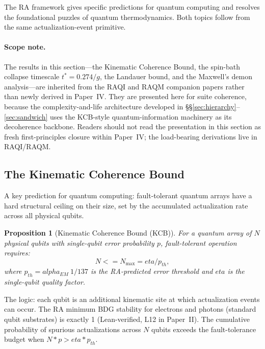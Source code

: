 \documentclass[11pt]{article}
\def\alpha{alpha}%
\def\eta{eta}%
\def\mathrm#1{#1}%
\def\frac#1#2{#1/#2}%
\def\cdot{*}%
\def\leq{<=}%
\def\approx{~}%
\newtheorem{proposition}{Proposition}
\begin{document}
The RA framework gives specific predictions for quantum computing and resolves the foundational puzzles of quantum thermodynamics. Both topics follow from the same actualization-event primitive.

\paragraph{Scope note.} The results in this section---the Kinematic Coherence Bound, the spin-bath collapse timescale $t^*=0.274/g$, the Landauer bound, and the Maxwell's demon analysis---are inherited from the RAQI and RAQM companion papers rather than newly derived in Paper~IV. They are presented here for suite coherence, because the complexity-and-life architecture developed in \S\S\ref{sec:hierarchy}--\ref{sec:sandwich} uses the KCB-style quantum-information machinery as its decoherence backbone. Readers should not read the presentation in this section as fresh first-principles closure within Paper~IV; the load-bearing derivations live in RAQI/RAQM.

\subsection{The Kinematic Coherence Bound}
\label{sec:kcb}

A key prediction for quantum computing: fault-tolerant quantum arrays have a hard structural ceiling on their size, set by the accumulated actualization rate across all physical qubits.

\begin{proposition}[Kinematic Coherence Bound (KCB)]
\label{prop:kcb}
For a quantum array of $N$ physical qubits with single-qubit error probability $p$, fault-tolerant operation requires:
\begin{equation}
N \leq N_{\max} = \frac{\eta}{p_{\mathrm{th}}},
\end{equation}
where $p_{\mathrm{th}} = \alpha_{\mathrm{EM}} \approx 1/137$ is the RA-predicted error threshold and $\eta$ is the single-qubit quality factor.
\end{proposition}

The logic: each qubit is an additional kinematic site at which actualization events can occur. The RA minimum BDG stability for electrons and photons (standard qubit substrates) is exactly 1 (Lean-verified, L12 in Paper~II). The cumulative probability of spurious actualizations across $N$ qubits exceeds the fault-tolerance budget when $N \cdot p > \eta \cdot p_{\mathrm{th}}$.
\end{document}
